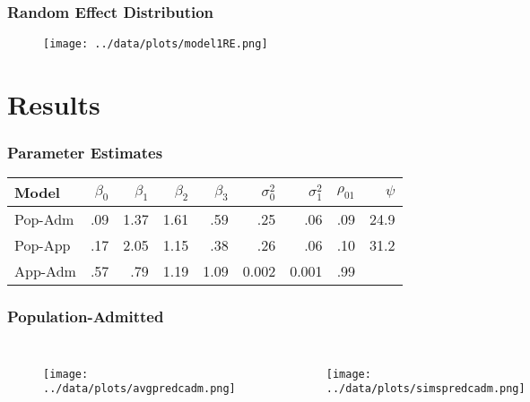 \documentclass{beamer}
\begin{document}

\begin{frame}
\frametitle{Random Effect Distribution}
\begin{figure}
\texttt{[image: ../data/plots/model1RE.png]}
\end{figure}
\end{frame}

\section{Results}

\begin{frame}
  \frametitle{Parameter Estimates}
\begin{tabular}{l|r|r|r|r|r|r|r|r}
\hline
Model & $\beta_0$ & $\beta_1$ & $\beta_2$ & $\beta_3$ & $\sigma^2_{0}$ & $\sigma^2_{1}$ & $\rho_{01}$ & $\psi$ \\
\hline
Pop-Adm & .09 & 1.37 & 1.61 & .59 & .25 & .06 & .09 & 24.9 \\
\hline
Pop-App & .17 & 2.05 & 1.15 & .38 & .26 & .06 & .10 & 31.2 \\
\hline
App-Adm & .57 & .79 & 1.19 & 1.09 & 0.002 & 0.001 & .99 &  \\
\hline
\end{tabular}
\end{frame}

\begin{frame}
\frametitle{Population-Admitted}
\begin{columns}[c] %

\begin{figure}
\texttt{[image: ../data/plots/avgpredcadm.png]}
\end{figure}

\begin{figure}
\texttt{[image: ../data/plots/simspredcadm.png]}
\end{figure}

\end{columns}
\end{frame}

\end{document}
